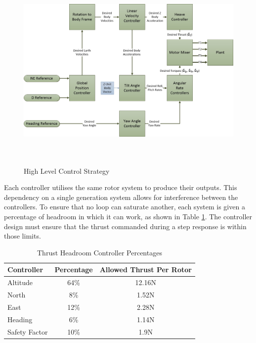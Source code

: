 \begin{figure}[H]
 	\centering
 	\includegraphics[height = 10cm]{../References/Diagrams/HighLevel.jpg}
 	\caption{High Level Control Strategy}
 	\label{IM_ControlStrategy}
\end{figure}

Each controller utilises the same rotor system to produce their outputs. This dependency on a single generation system allows for interference between the controllers. To ensure that no loop can saturate another, each system is given a percentage of headroom in which it can work, as shown in Table \ref{tab:HeadRoomPercentages}. The controller design must ensure that the thrust commanded during a step response is within those limits.

\begin{table}[H]
 	\centering
 	\begin{tabular}{l | c | c |}
 		Controller 				& Percentage & Allowed Thrust Per Rotor\\
 		\hline\hline
 		Altitude 	   			& 64\% & 12.16N	\\
 		North  		    		& 8\%  & 1.52N	\\
 		East					& 12\% & 2.28N	\\
 		Heading 		    	& 6\%  & 1.14N	\\
 		Safety Factor 			& 10\% & 1.9N   \\
 	\end{tabular}
 	\caption{Thrust Headroom Controller Percentages}
 	\label{tab:HeadRoomPercentages}
\end{table}
	 
